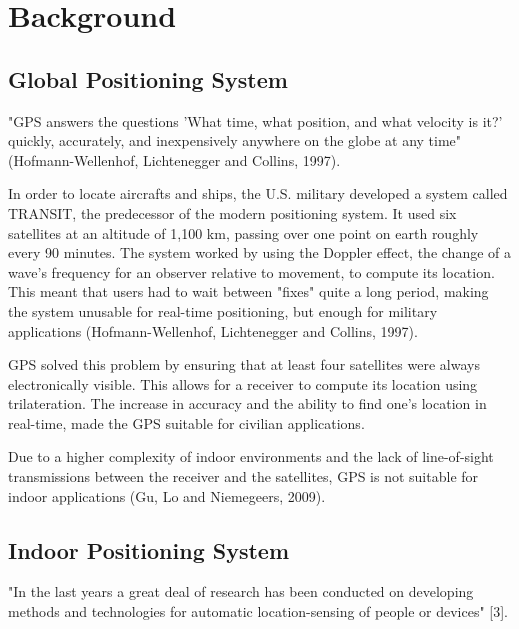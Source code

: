 \chapter{Background}

\section{Global Positioning System}
"GPS answers the questions 'What time, what position, and what velocity is it?' quickly, accurately, and inexpensively anywhere on the globe at any time" (Hofmann-Wellenhof, Lichtenegger and Collins, 1997).  

In order to locate aircrafts and ships, the U.S. military developed a system called TRANSIT, the predecessor of the modern positioning system. It used six satellites at an altitude of 1,100 km, passing over one point on earth roughly every 90 minutes. The system worked by using the Doppler effect, the change of a wave's frequency for an observer relative to movement, to compute its location. This meant that users had to wait between "fixes" quite a long period, making the system unusable for real-time positioning, but enough for military applications (Hofmann-Wellenhof, Lichtenegger and Collins, 1997). 

GPS solved this problem by ensuring that at least four satellites were always electronically visible. This allows for a receiver to compute its location using trilateration. The increase in accuracy and the ability to find one’s location in real-time, made the GPS suitable for civilian applications. 

Due to a higher complexity of indoor environments and the lack of line-of-sight transmissions between the receiver and the satellites, GPS is not suitable for indoor applications (Gu, Lo and Niemegeers, 2009).

\section{Indoor Positioning System}
"In the last years a great deal of research has been conducted on developing methods and technologies for automatic location-sensing of people or devices" [3]. 

